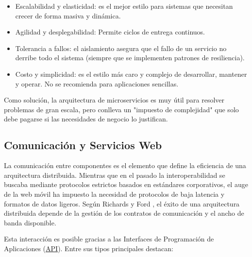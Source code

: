 \begin{itemize}
    \begin{itemize}
        \item Escalabilidad y elasticidad: es el mejor estilo para sistemas que necesitan crecer de forma masiva y dinámica.
        \item Agilidad y desplegabilidad: Permite ciclos de entrega continuos.
        \item Tolerancia a fallos: el aislamiento asegura que el fallo de un servicio no derribe todo el sistema (siempre 
        que se implementen patrones de resiliencia).
        \item Costo y simplicidad: es el estilo más caro y complejo de desarrollar, mantener y operar. No se recomienda 
        para aplicaciones sencillas.
    \end{itemize}

    Como solución, la arquitectura de microservicios es muy útil para resolver problemas de gran escala, pero conlleva un "impuesto de 
    complejidad" que solo debe pagarse si las necesidades de negocio lo justifican.
\end{itemize}

\subsection{Comunicación y Servicios Web}

La comunicación entre componentes es el elemento que define la eficiencia de una arquitectura distribuida. Mientras que en el pasado 
la interoperabilidad se buscaba mediante protocolos estrictos basados en estándares corporativos, el auge de la web móvil ha impuesto 
la necesidad de protocolos de baja latencia y formatos de datos ligeros. Según Richards y Ford \cite{libroArquitecturasSoftware}, el 
éxito de una arquitectura distribuida depende de la gestión de los contratos de comunicación y el ancho de banda disponible.

Esta interacción es posible gracias a las Interfaces de Programación de Aplicaciones (\hyperlink{api}{API}). Entre sus tipos principales 
destacan:

